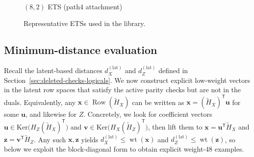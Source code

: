 \documentclass[a4paper,onecolumn,11pt,accepted=2026-08-03]{quantumarticle}
\newcommand{\Ker}{\mathrm{Ker}}
\newcommand{\Hres}{\tilde{H}}
\DeclareMathOperator{\Row}{Row}
\DeclareMathOperator{\wt}{wt}
\renewcommand\[{\begin{equation}}
\renewcommand\]{\end{equation}}
\theoremstyle{definition}
\begin{document}
\begin{figure}[t]
\begin{minipage}{0.70\linewidth}
\par
 $(8,2)$ ETS (path4 attachment)
\end{minipage}
\caption{Representative ETSs used in the library. }
\label{fig:ets-8cycles}
\end{figure}

\subsection{Minimum-distance evaluation}
Recall the latent-based distances $d_X^{(\mathrm{lat})}$ and $d_Z^{(\mathrm{lat})}$ defined in Section~\ref{sec:deleted-checks-logicals}. We now construct explicit low-weight vectors in the latent row spaces that satisfy the active parity checks but are not in the duals. Equivalently, any $\boldsymbol{x}\in\Row(\Hres_X)$ can be written as $\boldsymbol{x}=(\Hres_X)^{\mathsf T}\boldsymbol{u}$ for some $\boldsymbol{u}$, and likewise for $Z$.
Concretely, we look for coefficient vectors $\boldsymbol{u}\in\Ker\!\bigl(H_Z(\Hres_X)^{\mathsf T}\bigr)$ and $\boldsymbol{v}\in\Ker\!\bigl(H_X(\Hres_Z)^{\mathsf T}\bigr)$, then lift them to $\boldsymbol{x}=\boldsymbol{u}^{\mathsf T}\Hres_X$ and $\boldsymbol{z}=\boldsymbol{v}^{\mathsf T}\Hres_Z$. Any such $\boldsymbol{x},\boldsymbol{z}$ yields $d_X^{(\mathrm{lat})}\le \wt(\boldsymbol{x})$ and $d_Z^{(\mathrm{lat})}\le \wt(\boldsymbol{z})$, so below we exploit the block-diagonal form to obtain explicit weight-48 examples.
\end{document}

